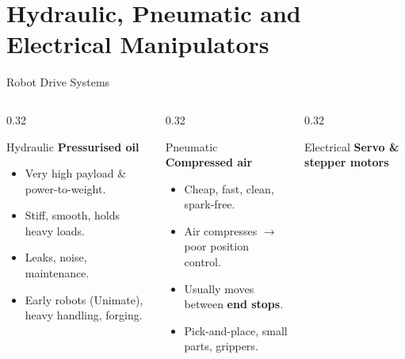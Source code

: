 \documentclass[aspectratio=169]{beamer}
\begin{document}
	\section{Hydraulic, Pneumatic and Electrical Manipulators}
	\begin{frame}{Robot Drive Systems}
		\begin{columns}[T]
			\begin{column}{0.32\textwidth}
				\begin{block}{Hydraulic}
					\centering
					\textbf{Pressurised oil}

					\vspace{0.2cm}

					\begin{itemize}\small
						\item Very high payload \& power-to-weight.
						\item Stiff, smooth, holds heavy loads.
						\item Leaks, noise, maintenance.
						\item Early robots (Unimate), heavy handling, forging.
					\end{itemize}
				\end{block}
			\end{column}
			\begin{column}{0.32\textwidth}
				\begin{block}{Pneumatic}
					\centering
					\textbf{Compressed air}

					\vspace{0.2cm}

					\begin{itemize}\small
						\item Cheap, fast, clean, spark-free.
						\item Air compresses $\rightarrow$ poor position control.
						\item Usually moves between \textbf{end stops}.
						\item Pick-and-place, small parts, grippers.
					\end{itemize}
				\end{block}
			\end{column}
			\begin{column}{0.32\textwidth}
				\begin{block}{Electrical}
					\centering
					\textbf{Servo \& stepper motors}

					\vspace{0.2cm}


\end{block}
\end{column}
\end{columns}
\end{frame}
\end{document}
